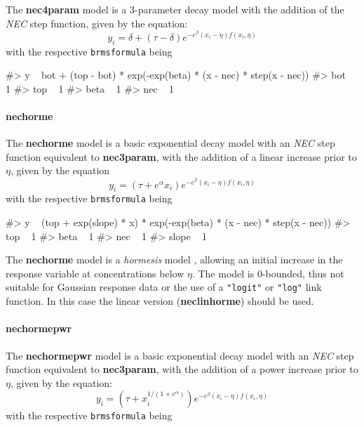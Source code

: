 The \textbf{nec4param} model is a 3-parameter decay model with the
addition of the \emph{NEC} step function, given by the equation:
\[y_i = \delta + (\tau - \delta) e^{-e^{\beta} \left(x_i - \eta \right) f(x_i, \eta)}\]
with the respective \texttt{brmsformula} being

\begin{Schunk}
\begin{Soutput}
#> y ~ bot + (top - bot) * exp(-exp(beta) * (x - nec) * step(x - nec)) 
#> bot ~ 1
#> top ~ 1
#> beta ~ 1
#> nec ~ 1
\end{Soutput}
\end{Schunk}

\hypertarget{nechorme}{%
\paragraph{nechorme}\label{nechorme}}

The \textbf{nechorme} model is a basic exponential decay model with an
\emph{NEC} step function equivalent to \textbf{nec3param}, with the
addition of a linear increase prior to \(\eta\), given by the equation
\[y_i = (\tau + e^{\alpha} x_i) e^{-e^{\beta} \left(x_i - \eta \right) f(x_i, \eta)}\]
with the respective \texttt{brmsformula} being

\begin{Schunk}
\begin{Soutput}
#> y ~ (top + exp(slope) * x) * exp(-exp(beta) * (x - nec) * step(x - nec)) 
#> top ~ 1
#> beta ~ 1
#> nec ~ 1
#> slope ~ 1
\end{Soutput}
\end{Schunk}

The \textbf{nechorme} model is a \emph{hormesis} model
\citep{Mattson2008}, allowing an initial increase in the response
variable at concentrations below \(\eta\). The model is 0-bounded, thus
not suitable for Gaussian response data or the use of a \texttt{"logit"}
or \texttt{"log"} link function. In this case the linear version
(\textbf{neclinhorme}) should be used.

\hypertarget{nechormepwr}{%
\paragraph{nechormepwr}\label{nechormepwr}}

The \textbf{nechormepwr} model is a basic exponential decay model with
an \emph{NEC} step function equivalent to \textbf{nec3param}, with the
addition of a power increase prior to \(\eta\), given by the equation:
\[y_i = (\tau + x_i^{1/(1+e^{\alpha})}) e^{-e^{\beta} \left(x_i - \eta \right) f(x_i, \eta)}\]
with the respective \texttt{brmsformula} being

